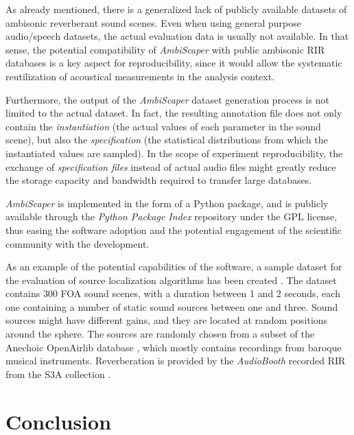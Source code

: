 As already mentioned, there is a generalized lack of publicly available datasets of ambisonic reverberant sound scenes. 
Even when using general purpose audio/speech datasets, the actual evaluation data is usually not available.
In that sense, the potential compatibility of \textit{AmbiScaper} with public ambisonic RIR databases is a key aspect for reproducibility, since it would allow the systematic reutilization of acoustical measurements in the analysis context.

Furthermore, the output of the \textit{AmbiScaper} dataset generation process is not limited to the actual dataset. 
In fact, the resulting annotation file does not only contain the \textit{instantiation} (the actual values of each parameter in the sound scene), but also the \textit{specification} (the statistical distributions from which the instantiated values are sampled). 
In the scope of experiment reproducibility, the exchange of \textit{specification files} instead of actual audio files might greatly reduce the storage capacity and bandwidth required to transfer large databases. 

\textit{AmbiScaper} is implemented in the form of a Python package, and is publicly available through the \textit{Python Package Index} repository  under the GPL license, thus easing the software adoption and the potential engagement of the scientific community with the development. 

As an example of the potential capabilities of the software, a sample dataset for the evaluation of source localization algorithms has been created \cite{ambiscaperDataset}.
The dataset contains 300 FOA sound scenes, with a duration between 1 and 2 seconds, each one containing a number of static sound sources between one and three.
Sound sources might have different gains, and they are located at random positions around the sphere. 
The sources are randomly chosen from a subset of the Anechoic OpenAirlib database \cite{openair}, which mostly contains recordings from baroque musical instruments.
Reverberation is provided by the \textit{AudioBooth} recorded RIR from the S3A collection \cite{coleman2015s3a}.\\





\section{Conclusion}

